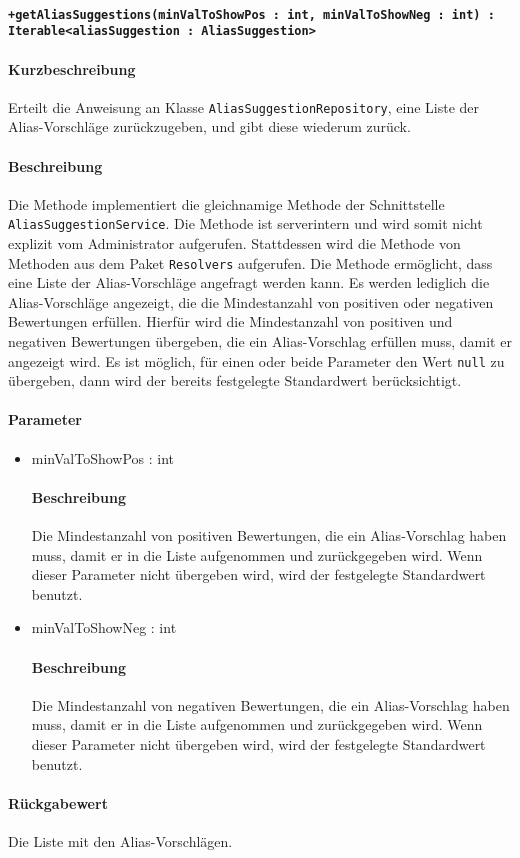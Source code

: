 \paragraph*{\texttt{+getAliasSuggestions(minValToShowPos : int, minValToShowNeg : int) : Iterable<aliasSuggestion : AliasSuggestion>}}%
\paragraph*{Kurzbeschreibung}
Erteilt die Anweisung an Klasse \texttt{AliasSuggestionRepository}, eine Liste der Alias-Vorschläge zurückzugeben, und gibt diese wiederum zurück.
\paragraph*{Beschreibung}
Die Methode implementiert die gleichnamige Methode der Schnittstelle \texttt{AliasSuggestionService}.
Die Methode ist serverintern und wird somit nicht explizit vom Administrator aufgerufen.
Stattdessen wird die Methode von Methoden aus dem Paket \texttt{Resolvers} aufgerufen.
Die Methode ermöglicht, dass eine Liste der Alias-Vorschläge angefragt werden kann.
Es werden lediglich die Alias-Vorschläge angezeigt, die die Mindestanzahl von positiven oder negativen Bewertungen erfüllen.
Hierfür wird die Mindestanzahl von positiven und negativen Bewertungen übergeben, die ein Alias-Vorschlag erfüllen muss, damit er angezeigt wird.
Es ist möglich, für einen oder beide Parameter den Wert \texttt{null} zu übergeben, dann wird der bereits festgelegte Standardwert berücksichtigt.
\paragraph*{Parameter}
\begin{itemize}
	\item minValToShowPos : int
		\paragraph*{Beschreibung}
		Die Mindestanzahl von positiven Bewertungen, die ein Alias-Vorschlag haben muss, damit er in die Liste aufgenommen und zurückgegeben wird.
		Wenn dieser Parameter nicht übergeben wird, wird der festgelegte Standardwert benutzt.
	\item minValToShowNeg : int
		\paragraph*{Beschreibung}
		Die Mindestanzahl von negativen Bewertungen, die ein Alias-Vorschlag haben muss, damit er in die Liste aufgenommen und zurückgegeben wird. 
		Wenn dieser Parameter nicht übergeben wird, wird der festgelegte Standardwert benutzt.
\end{itemize}
\paragraph*{Rückgabewert}
Die Liste mit den Alias-Vorschlägen. 

